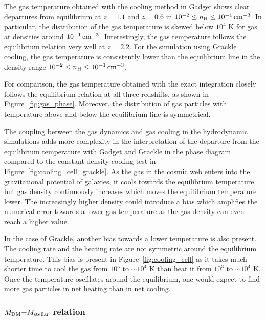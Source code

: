 \documentclass[a4paper,fleqn,usenatbib,useAMS, twocolumn]{mnras}
\begin{document}
The gas temperature obtained with the cooling method in {\sc Gadget} shows clear departures from 
equilibrium at $z = 1.1$ and $ z = 0.6$  in $10^{-2}\le n_{\rm H}\le 10^{-1}\, \rm{cm^{-3}}$. 
In particular, the distribution of the gas temperature is skewed below $10^4$ K for gas at densities
around $10^{-1}\, \rm{cm^{-3}}$. Interestingly, the gas temperature follows the equilibrium relation very 
well at $z = 2.2$. For the simulation using {\sc Grackle} cooling, the gas temperature is consistently 
lower than the equilibrium line in the density range $10^{-2} \le n_{\rm H} \le 10^{-1}\, \rm{cm^{-3}}$. 

For comparison, the gas temperature obtained with the exact integration closely follows the 
equilibrium relation at all three redshifts, as shown in Figure~\ref{fig:gas_phase}. 
Moreover, the distribution of gas particles with temperature above and below the equilibrium line
is symmetrical. 

The coupling between the gas dynamics and gas cooling in the hydrodynamic simulations 
adds more complexity in the interpretation of the departure from the equilibrium temperature with 
{\sc Gadget} and {\sc Grackle} in the phase diagram compared to the constant density cooling 
test in Figure~\ref{fig:cooling_cell_grackle}. As the gas in the cosmic web enters into the gravitational 
potential of galaxies, it cools towards the equilibrium temperature but gas density 
continuously increases which moves the equilibrium temperature lower. 
The increasingly higher density could introduce a bias which amplifies 
the numerical error towards a lower gas temperature as the gas density can even reach 
a higher value.

In the case of {\sc Grackle}, another bias towards a lower temperature is also present. 
The cooling rate and the heating rate are not symmetric around the equilibrium temperature.
This bias is present in Figure~\ref{fig:cooling_cell} as it takes much shorter time to
cool the gas from $10^5$ to $\sim10^4$ K than heat it from $10^3$ to $\sim10^4$ K. 
Once the temperature oscillates around the equilibrium, one would expect to find 
more gas particles in net heating than in net cooling.


\subsubsection{$M_{\rm DM}$--$M_{\rm stellar}$ relation}
 
\end{document}
